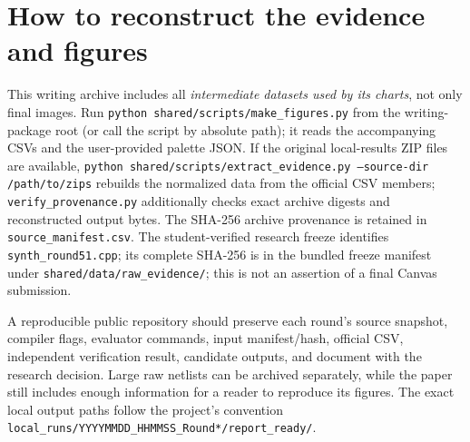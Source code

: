\section{How to reconstruct the evidence and figures}
This writing archive includes all \emph{intermediate datasets used by its charts}, not only final images. Run \texttt{python shared/scripts/make\_figures.py} from the writing-package root (or call the script by absolute path); it reads the accompanying CSVs and the user-provided palette JSON. If the original local-results ZIP files are available, \texttt{python shared/scripts/extract\_evidence.py --source-dir /path/to/zips} rebuilds the normalized data from the official CSV members; \texttt{verify\_provenance.py} additionally checks exact archive digests and reconstructed output bytes. The SHA-256 archive provenance is retained in \texttt{source\_manifest.csv}. The student-verified research freeze identifies \texttt{synth\_round51.cpp}; its complete SHA-256 is in the bundled freeze manifest under \texttt{shared/data/raw\_evidence/}; this is not an assertion of a final Canvas submission.

A reproducible public repository should preserve each round's source snapshot, compiler flags, evaluator commands, input manifest/hash, official CSV, independent verification result, candidate outputs, and document with the research decision. Large raw netlists can be archived separately, while the paper still includes enough information for a reader to reproduce its figures. The exact local output paths follow the project's convention \texttt{local\_runs/YYYYMMDD\_HHMMSS\_Round*/report\_ready/}.


